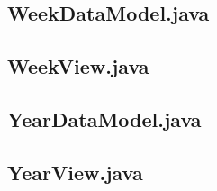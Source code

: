 \documentclass{article}
\begin{document}


\subsection{WeekDataModel.java}



\subsection{WeekView.java}



\subsection{YearDataModel.java}



\subsection{YearView.java}


\end{document}
